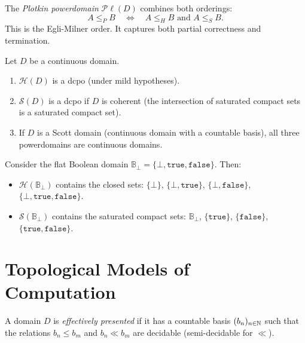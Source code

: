 \begin{definition}
The \emph{Plotkin powerdomain} $\mathcal{P}\ell(D)$ combines both orderings:
\[
  A \leq_P B \quad \Longleftrightarrow \quad A \leq_H B \text{ and } A \leq_S B.
\]
This is the Egli-Milner order. It captures both partial correctness and termination.
\end{definition}

\begin{theorem}
Let $D$ be a continuous domain.
\begin{enumerate}
  \item $\mathcal{H}(D)$ is a dcpo (under mild hypotheses).
  \item $\mathcal{S}(D)$ is a dcpo if $D$ is coherent (the intersection of saturated
    compact sets is a saturated compact set).
  \item If $D$ is a Scott domain (continuous domain with a countable basis), all three
    powerdomains are continuous domains.
\end{enumerate}
\end{theorem}

\begin{example}
Consider the flat Boolean domain $\mathbb{B}_\bot = \{\bot, \mathtt{true},
\mathtt{false}\}$. Then:
\begin{itemize}
  \item $\mathcal{H}(\mathbb{B}_\bot)$ contains the closed sets: $\{\bot\}$,
    $\{\bot, \mathtt{true}\}$, $\{\bot, \mathtt{false}\}$,
    $\{\bot, \mathtt{true}, \mathtt{false}\}$.
  \item $\mathcal{S}(\mathbb{B}_\bot)$ contains the saturated compact sets:
    $\mathbb{B}_\bot$, $\{\mathtt{true}\}$, $\{\mathtt{false}\}$,
    $\{\mathtt{true}, \mathtt{false}\}$.
\end{itemize}
\end{example}

\section{Topological Models of Computation}

\begin{definition}
A domain $D$ is \emph{effectively presented} if it has a countable basis $(b_n)_{n \in \mathbb{N}}$
such that the relations $b_n \leq b_m$ and $b_n \ll b_m$ are decidable (semi-decidable
for $\ll$).
\end{definition}

